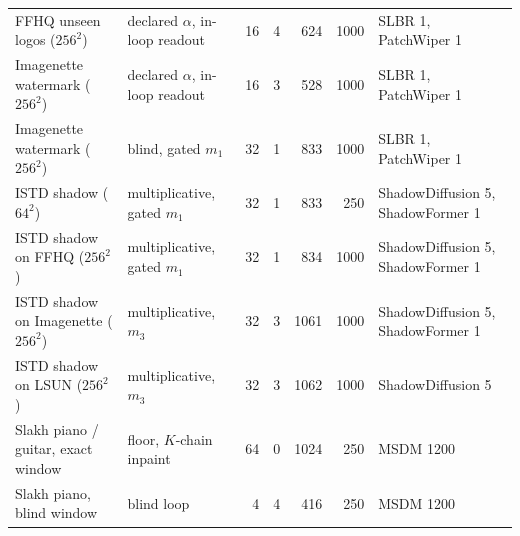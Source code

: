 \begin{table}[t]
\begin{tabular}{@{}llrrrrl@{}}
        FFHQ unseen logos ($256^2$) & declared $\alpha$, in-loop readout & 16 & 4 & 624 & 1000 & SLBR 1, PatchWiper 1 \\
        Imagenette watermark ($256^2$) & declared $\alpha$, in-loop readout & 16 & 3 & 528 & 1000 & SLBR 1, PatchWiper 1 \\
        Imagenette watermark ($256^2$) & blind, gated $m_1$ & 32 & 1 & 833 & 1000 & SLBR 1, PatchWiper 1 \\
        \midrule
        ISTD shadow ($64^2$) & multiplicative, gated $m_1$ & 32 & 1 & 833 & 250 & ShadowDiffusion 5, ShadowFormer 1 \\
        ISTD shadow on FFHQ ($256^2$) & multiplicative, gated $m_1$ & 32 & 1 & 834 & 1000 & ShadowDiffusion 5, ShadowFormer 1 \\
        ISTD shadow on Imagenette ($256^2$) & multiplicative, $m_3$ & 32 & 3 & 1061 & 1000 & ShadowDiffusion 5, ShadowFormer 1 \\
        ISTD shadow on LSUN ($256^2$) & multiplicative, $m_3$ & 32 & 3 & 1062 & 1000 & ShadowDiffusion 5 \\
        \midrule
        Slakh piano / guitar, exact window & floor, $K$-chain inpaint & 64 & 0 & 1024 & 250 & MSDM 1200 \\
        Slakh piano, blind window & blind loop & 4 & 4 & 416 & 250 & MSDM 1200 \\
        \bottomrule
    \end{tabular}
\end{table}
